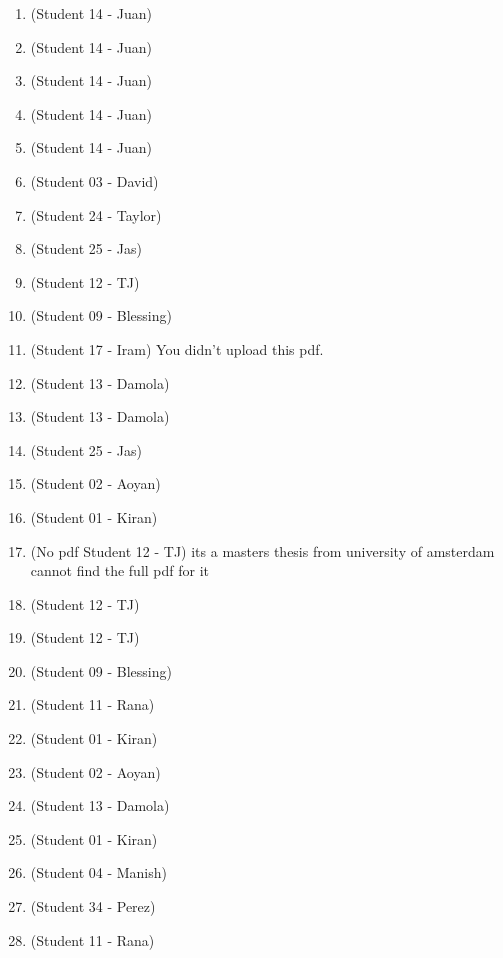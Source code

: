 \begin{enumerate}[label=\#\arabic*]
\item \cite{paterson1996newI} (Student 14 - Juan)
\item \cite{zhou2021m} (Student 14 - Juan)
\item \cite{albitar2007design} (Student 14 - Juan)
\item \cite{luo2018multi} (Student 14 - Juan)
\item \cite{elahi2023single} (Student 14 - Juan)
\item \cite{macwilliams1976pseudo} (Student 03 - David)
\item \cite{hurlbert1990universal} (Student 24 - Taylor)
\item \cite{luke1988sequences} (Student 25 - Jas)
\item \cite{schusselbauer2021dothraki} (Student 12 - TJ)
\item \cite{chee2024bruijn} (Student 09 - Blessing)
\item \cite{vyahhi2012bruijn} (Student 17 - Iram)
You didn't upload this pdf.
\item \cite{wijenayake2015dual} (Student 13 - Damola)
\item \cite{zhu2022hydramarker} (Student 13 - Damola)
\item \cite{isaak2002constructions} (Student 25 - Jas)
\item \cite{chee2025hierarchy} (Student 02 - Aoyan)
\item \cite{gordon1966existence} (Student 01 - Kiran) 
\item \cite{kapinya2004evolutionary}(No pdf Student 12 - TJ) its a masters thesis from university of amsterdam cannot find the full pdf for it 
\item \cite{burns1992coding}(Student 12 - TJ)
\item \cite{berkowitz2016robust} (Student 12 - TJ)
\item \cite{blackburn2026bruijn} (Student 09 - Blessing)
\item \cite{millan2026ritmo} (Student 11 - Rana)
\item \cite{nomura1972theory} (Student 01 - Kiran)
\item \cite{miyashita2022high} (Student 02 - Aoyan)
\item \cite{herout2013five} (Student 13 - Damola)
\item \cite{ma1984note} (Student 01 - Kiran)
\item \cite{tesler2026phased} (Student 04 - Manish)
\item \cite{huang2023comprehensive} (Student 34 - Perez)
\item \cite{jackson2009research} (Student 11 - Rana)

\end{enumerate}
